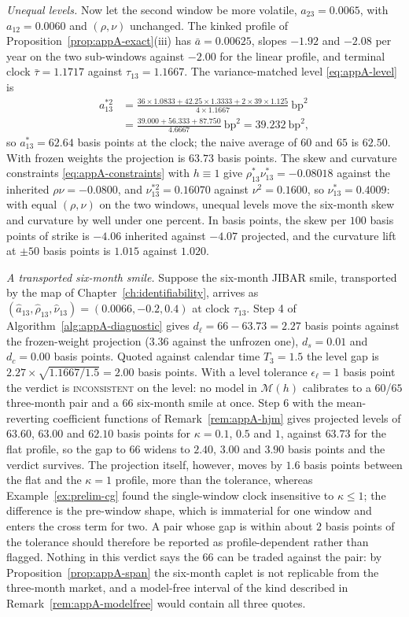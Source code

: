 \documentclass[../../main.tex]{subfiles}
\begin{document}
\emph{Unequal levels.} Now let the second window be more volatile, $a_{23}=0.0065$, with $a_{12}=0.0060$ and $(\rho,\nu)$ unchanged. The kinked profile of Proposition~\ref{prop:appA-exact}(iii) has $\bar a=0.00625$, slopes $-1.92$ and $-2.08$ per year on the two sub-windows against $-2.00$ for the linear profile, and terminal clock $\bar\tau=1.1717$ against $\tau_{13}=1.1667$. The variance-matched level \eqref{eq:appA-level} is
\begin{align*}
a_{13}^{*2}&=\frac{36\times1.0833+42.25\times1.3333+2\times39\times1.125}{4\times1.1667}\ \text{bp}^2\\
&=\frac{39.000+56.333+87.750}{4.6667}\ \text{bp}^2=39.232\ \text{bp}^2,
\end{align*}
so $a_{13}^*=62.64$ basis points at the clock; the naive average of $60$ and $65$ is $62.50$. With frozen weights the projection is $63.73$ basis points. The skew and curvature constraints \eqref{eq:appA-constraints} with $h\equiv1$ give $\rho_{13}^*\nu_{13}^*=-0.08018$ against the inherited $\rho\nu=-0.0800$, and $\nu_{13}^{*2}=0.16070$ against $\nu^2=0.1600$, so $\nu_{13}^*=0.4009$: with equal $(\rho,\nu)$ on the two windows, unequal levels move the six-month skew and curvature by well under one percent. In basis points, the skew per $100$ basis points of strike is $-4.06$ inherited against $-4.07$ projected, and the curvature lift at $\pm50$ basis points is $1.015$ against $1.020$.

\emph{A transported six-month smile.} Suppose the six-month JIBAR smile, transported by the map of Chapter~\ref{ch:identifiability}, arrives as $(\hat a_{13},\hat\rho_{13},\hat\nu_{13})=(0.0066,-0.2,0.4)$ at clock $\tau_{13}$. Step 4 of Algorithm~\ref{alg:appA-diagnostic} gives $d_\ell=66-63.73=2.27$ basis points against the frozen-weight projection ($3.36$ against the unfrozen one), $d_s=0.01$ and $d_c=0.00$ basis points. Quoted against calendar time $T_3=1.5$ the level gap is $2.27\times\sqrt{1.1667/1.5}=2.00$ basis points. With a level tolerance $\epsilon_\ell=1$ basis point the verdict is \textsc{inconsistent} on the level: no model in $\mathcal M(h)$ calibrates to a $60$/$65$ three-month pair and a $66$ six-month smile at once. Step 6 with the mean-reverting coefficient functions of Remark~\ref{rem:appA-hjm} gives projected levels of $63.60$, $63.00$ and $62.10$ basis points for $\kappa=0.1$, $0.5$ and $1$, against $63.73$ for the flat profile, so the gap to $66$ widens to $2.40$, $3.00$ and $3.90$ basis points and the verdict survives. The projection itself, however, moves by $1.6$ basis points between the flat and the $\kappa=1$ profile, more than the tolerance, whereas Example~\ref{ex:prelim-cg} found the single-window clock insensitive to $\kappa\le1$; the difference is the pre-window shape, which is immaterial for one window and enters the cross term for two. A pair whose gap is within about $2$ basis points of the tolerance should therefore be reported as profile-dependent rather than flagged. Nothing in this verdict says the $66$ can be traded against the pair: by Proposition~\ref{prop:appA-span} the six-month caplet is not replicable from the three-month market, and a model-free interval of the kind described in Remark~\ref{rem:appA-modelfree} would contain all three quotes.
\end{document}
